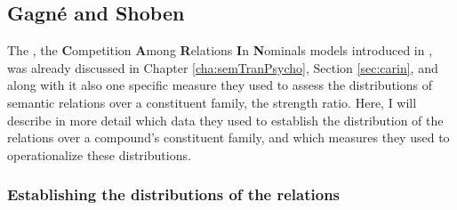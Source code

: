 
\subsection{Gagné and Shoben}
\label{sec:gagneshoben-rel}

The , the \textbf{C}ompetition \textbf{A}mong
\textbf{R}elations \textbf{I}n \textbf{N}ominals models introduced in
\citet{GagneandShoben:1997}, was already discussed in Chapter
\ref{cha:semTranPsycho}, Section \ref{sec:carin}, and along with it
also one specific measure they used to assess the distributions of
semantic relations over a constituent family, the strength
ratio. Here, I will describe in more detail which data they used to
establish the distribution of the relations over a compound's
constituent family, and which measures they used to operationalize
these distributions.

\subsubsection{Establishing the distributions of the relations}
\label{sec:gagneShobenEstabRelDistro}


